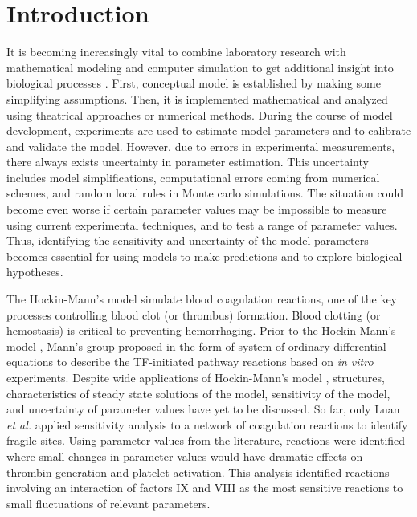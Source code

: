 
\section*{Introduction}
\label{sec:intro}


 It is becoming increasingly vital to combine
laboratory research with mathematical modeling and computer
simulation to get additional insight into biological processes
\cite{AssHer06,Arn06,CNX,HRAMMA,LGWNC,
LZV,MCNJY,PWSNCM,SJKA1,SJKA2,SCBM,TPMA,WJKA}. %
First, conceptual model is established by making some simplifying
assumptions. Then, it is implemented mathematical and analyzed using
theatrical approaches or numerical methods. During the course of
model development, experiments are used to estimate model parameters
and to calibrate
 and validate the model. However, due to errors in experimental
measurements, there always exists uncertainty in parameter
estimation. This uncertainty includes model simplifications,
computational errors coming from numerical schemes, and random local
rules in Monte carlo simulations. The situation could become even
worse if certain parameter values may be impossible to measure using
current experimental techniques, and to test a range of parameter
values. %
Thus, identifying the sensitivity and uncertainty
of the model parameters becomes essential for using models to make
predictions and to explore biological hypotheses.

The Hockin-Mann's model \cite{HocJon02} simulate blood coagulation
reactions, one of the key processes controlling blood clot (or
thrombus) formation. Blood clotting (or hemostasis) is critical to
preventing hemorrhaging. Prior to the Hockin-Mann's model
\cite{HocJon02}, Mann's group proposed in the form of system of
ordinary differential equations \cite{JonMan94a,JonMan94b} to
describe the TF-initiated pathway reactions based on \emph{in vitro}
experiments. Despite wide applications of Hockin-Mann's model
\cite{JonMan94a}, structures, characteristics of steady state
solutions of the model, sensitivity of the model, and uncertainty of
parameter values have
yet to be discussed. %
 So far,  only Luan \emph{et al.} \cite{LZV}  applied sensitivity analysis to a network of
coagulation reactions to identify fragile sites. Using parameter
values from the literature, reactions were identified where small
changes in parameter values would have dramatic effects on thrombin
generation and platelet activation. This analysis \cite{LZV}
 identified reactions involving an interaction of factors IX and VIII
as the most sensitive reactions to small fluctuations of relevant
parameters.


